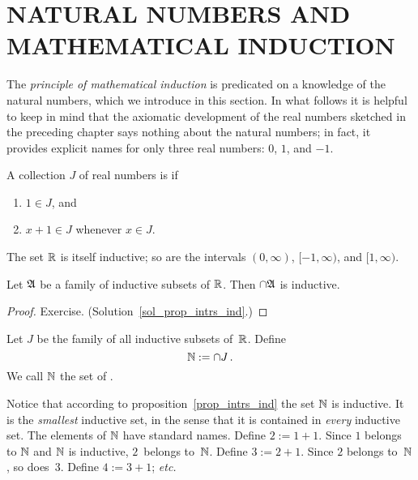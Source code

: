 \chapter{NATURAL NUMBERS AND MATHEMATICAL INDUCTION}\label{nat_nos}


 \setcounter{section}{1}
 \setcounter{thm}{0}


The \emph{principle of mathematical induction} is predicated on a knowledge of the natural
numbers, which we introduce in this section.  In what follows it is helpful to keep in mind
that the axiomatic development of the real numbers sketched in the preceding chapter says
nothing about the natural numbers; in fact, it provides explicit names for only three real
numbers: $0$, $1$, and $-1$.

\begin{defn}  A collection $J$ of real numbers is
 if
 \begin{enumerate}
  \item $1 \in J$,\; and
  \item $x + 1 \in J$ whenever $x \in J$.
 \end{enumerate}
\end{defn}

\begin{exam}  The set $\mathbb{R}$ is itself inductive; so are the intervals $(0,\infty)$, $[-1, \infty)$,
and $[1,\infty)$.
\end{exam}

\begin{prop}\label{prop_intrs_ind}  Let $\mathfrak{A}$ be a family of inductive subsets of $\mathbb{R}$. Then
$\cap \mathfrak{A}$ is inductive.
\end{prop}

\begin{proof} Exercise. (Solution~\ref{sol_prop_intrs_ind}.)   \ns
\end{proof}

\begin{defn}  Let $J$ be the family of all inductive subsets of~$\mathbb{R}$.  Define
   \[ \mathbb{N} := \cap J\,. \]
We call $\mathbb{N}$ the set of
.
\end{defn}

Notice that according to proposition~\ref{prop_intrs_ind} the set $\mathbb{N}$ is inductive.  It is
the \emph{smallest} inductive set, in the sense that it is contained in \emph{every} inductive
set.  The elements of $\mathbb{N}$ have standard names. Define $2 := 1 + 1$.  Since $1$ belongs to
$\mathbb{N}$ and $\mathbb{N}$ is inductive, $2$~belongs to~$\mathbb{N}$. Define $3 := 2 + 1$.  Since $2$ belongs
to~$\mathbb{N}$, so does~$3$. Define $4 := 3 + 1$; \emph{etc.}

